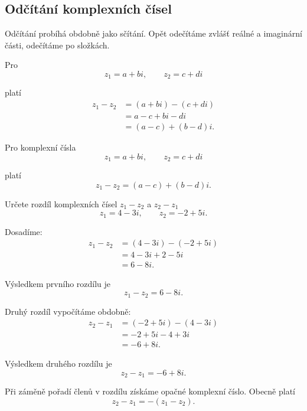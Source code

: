 \documentclass[12pt,a4paper]{article}
\begin{document}
\subsection{Odčítání komplexních čísel}
Odčítání probíhá obdobně jako sčítání. Opět odečítáme zvlášť reálné a imaginární části,
odečítáme po složkách.

Pro
\[
    z_1=a+bi, \qquad z_2=c+di
\]

platí
\begin{align*}
    z_1-z_2 &= (a+bi)-(c+di)\\
            &= a-c+bi-di\\
            &= (a-c)+(b-d)i.
\end{align*}

\begin{definitionbox}
    Pro komplexní čísla
    \[
        z_1=a+bi, \qquad z_2=c+di
    \]

    platí
    \[
        z_1-z_2 = (a-c)+(b-d)i.
    \]
\end{definitionbox}

\begin{examplebox}
    Určete rozdíl komplexních čísel $z_1-z_2$ a $z_2-z_1$
    \[
        z_1=4-3i, \qquad z_2=-2+5i.
    \]

    Dosadíme:
    \begin{align*}
        z_1-z_2 &= (4-3i)-(-2+5i) \\
                &= 4-3i+2-5i \\
                &= 6-8i.
    \end{align*}

    Výsledkem prvního rozdílu je
    \[
        z_1-z_2 = 6-8i.
    \]

    Druhý rozdíl vypočítáme obdobně:
    \begin{align*}
        z_2-z_1 &= (-2+5i)-(4-3i)\\
                &= -2+5i-4+3i\\
                &= -6+8i.
    \end{align*}

    Výsledkem druhého rozdílu je
    \[
        z_2-z_1=-6+8i.
    \]

\end{examplebox}

\begin{notebox}
    Při záměně pořadí členů v rozdílu získáme opačné komplexní číslo. Obecně platí
    \[
        z_2-z_1=-(z_1-z_2).
    \]
\end{notebox}
\end{document}

